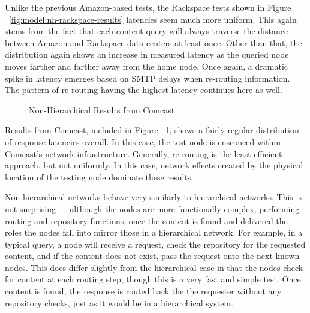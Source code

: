 Unlike the previous Amazon-based tests, the Rackspace tests shown in Figure ~\ref{fig:model:nh-rackspace-results} latencies seem much more uniform.  This again stems from the fact that each content query will always traverse the distance between Amazon and Rackspace data centers at least once.  Other than that, the distribution again shows an increase in measured latency as the queried node moves farther and farther away from the home node.  Once again, a dramatic spike in latency emerges based on SMTP delays when re-routing information.  The pattern of re-routing having the highest latency continues here as well.


\begin{figure}[htbp]
\begin{minipage}[b]{0.5\linewidth}
\centering
{}
\end{minipage}
\begin{minipage}[b]{0.5\linewidth}
\centering
{}
\end{minipage}
\caption{Non-Hierarchical Results from Comcast}
\label{fig:model:nh-comcast-results}
\end{figure}

Results from Comcast, included in Figure ~\ref{fig:model:nh-comcast-results}, shows a fairly regular distribution of response latencies overall.  In this case, the test node is ensconced within Comcast's network infrastructure.  Generally, re-routing is the least efficient approach, but not uniformly.  In this case, network effects created by the physical location of the testing node dominate these results.

Non-hierarchical networks behave very similarly to hierarchical networks.  This is not surprising --- although the nodes are more functionally complex, performing routing and repository functions, once the content is found and delivered the roles the nodes fall into mirror those in a hierarchical network.  For example, in a typical query, a node will receive a request, check the repository for the requested content, and if the content does not exist, pass the request onto the next known nodes.  This does differ slightly from the hierarchical case in that the nodes check for content at each routing step, though this is a very fast and simple test.  Once content is found, the response is routed back the the requester without any repository checks, just as it would be in a hierarchical system.

